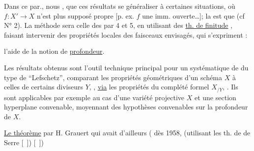 Dans ce par., nous 
, que ces résultats 
se généraliser à certaines situations, où $f:X'\longrightarrow X$
n'est plus supposé propre [p. ex. $f$ une imm. ouverte\ldots];
la   
est que  
  (cf N° 2).
La méthode sera celle des par 4 et 5,
en utilisant des \uline{th. de finitude}
 
, faisant intervenir des propriétés
locales des faisceaux envisagés, qui s'expriment :


l'aide de la notion de \uline{profondeur}.

Les résultats  obtenus sont l'outil technique
principal pour un 
 systématique de
 
du type de ``Lefschetz'', comparant les propriétés géométriques
d'un schéma $X$ à celles de certains 
diviseurs $Y$, 
 ,
\uline{via} les propriétés du complété formel $X_{/Y}$, .
Ils sont applicables par exemple
au cas d'une variété projective $X$ et une section hyperplane
convenable, moyennant des hypothèses 
convenables sur la profondeur de $X$.

\uline{Le théorème} 
par H. Grauert qui avait d'ailleurs
( dès 1958,
(utilisant les th. de  de Serre [\ ]) [\ ])

